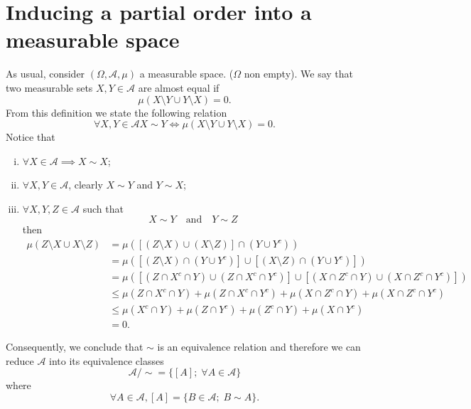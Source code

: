 \documentclass[11pt,twoside,a4paper]{article}
\begin{document}
\section{Inducing a partial order into a measurable space}
As usual, consider $(\Omega, \mathcal{A}, \mu)$ a measurable space.
($\Omega$ non empty). We say that two measurable sets $X,Y \in \mathcal{A}$  
are almost equal if 
\begin{equation*}
    \mu( X \setminus Y \cup Y \setminus X ) = 0.
\end{equation*}
From this definition we state the following relation
\begin{equation*}
    \forall X, Y \in \mathcal{A}
    X \sim Y \iff 
    \mu( X \setminus Y \cup Y \setminus X ) = 0.
\end{equation*}
Notice that
\begin{enumerate}[(i)]
   \item $\forall X \in \mathcal{A} \implies X \sim X$;
   
   \item $\forall X, Y \in \mathcal{A}$, clearly $X \sim Y$ 
   and $Y \sim X$;

   \item $\forall X, Y, Z \in \mathcal{A}$ such that
   \begin{equation*}
        X \sim Y \quad \text{and} \quad Y \sim Z
   \end{equation*}
   then 
   \begin{align*}
    \mu( Z \setminus X \cup X \setminus Z )
        & = \mu( [(Z \setminus X) \cup (X \setminus Z)] \cap (Y \cup Y^c) )\\
        & = \mu( [(Z \setminus X)\cap (Y \cup Y^c)]
               \cup 
               [(X \setminus Z) \cap (Y \cup Y^c)] )\\
        & = \mu( [(Z \cap X^c \cap Y) \cup (Z \cap X^c \cap Y^c)]
               \cup 
               [(X \cap Z^c \cap Y)  \cup (X \cap Z^c \cap Y^c)] )\\
        & \leq
            \mu( Z \cap X^c \cap Y)
            + \mu(Z \cap X^c \cap Y^c)
            + \mu(X \cap Z^c \cap Y) 
            + \mu(X \cap Z^c \cap Y^c)\\
        & \leq
            \mu(X^c \cap Y)
            + \mu(Z \cap Y^c)
            + \mu(Z^c \cap Y) 
            + \mu(X \cap Y^c)\\
        & = 0.
   \end{align*}
\end{enumerate}
Consequently, we conclude that $\sim$ is an equivalence relation and
therefore we can reduce $\mathcal{A}$ into its equivalence classes  
\begin{equation*}
    \mathcal{A} / \sim = \{ [A]; \; \forall A \in \mathcal{A} \}
\end{equation*}
where
\begin{equation*}
    \forall A \in \mathcal{A}, [A] = \{ B \in \mathcal{A}; \; B \sim A \}.
\end{equation*}
\end{document}
